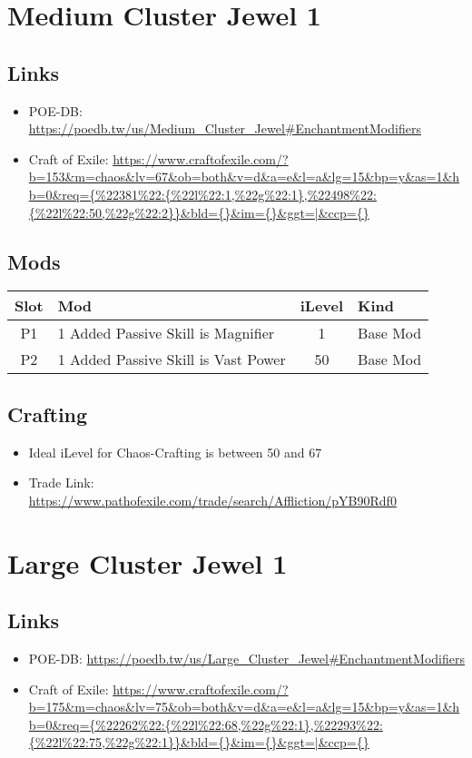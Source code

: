 \section{Medium Cluster Jewel 1}
\subsection{Links}
\begin{itemize}
	\item POE-DB: \url{https://poedb.tw/us/Medium_Cluster_Jewel#EnchantmentModifiers}
	\item Craft of Exile: \url{https://www.craftofexile.com/?b=153&m=chaos&lv=67&ob=both&v=d&a=e&l=a&lg=15&bp=y&as=1&hb=0&req={%
\end{itemize}
\subsection{Mods}
\begin{tabular}{|c|l|c|l|}
	\hline
	Slot&Mod&iLevel&Kind\\\hline
	P1& 1 Added Passive Skill is Magnifier&1& Base Mod \\\hline
	P2& 1 Added Passive Skill is Vast Power&50& Base Mod \\\hline
\end{tabular}

\subsection{Crafting}
\begin{itemize}
	\item Ideal iLevel for Chaos-Crafting is between 50 and 67
	\item Trade Link: \url{https://www.pathofexile.com/trade/search/Affliction/pYB90Rdf0}
\end{itemize}

\section{Large Cluster Jewel 1}
\subsection{Links}
\begin{itemize}
	\item POE-DB: \url{https://poedb.tw/us/Large_Cluster_Jewel#EnchantmentModifiers}
	\item Craft of Exile: \url{https://www.craftofexile.com/?b=175&m=chaos&lv=75&ob=both&v=d&a=e&l=a&lg=15&bp=y&as=1&hb=0&req={%
\end{itemize}
